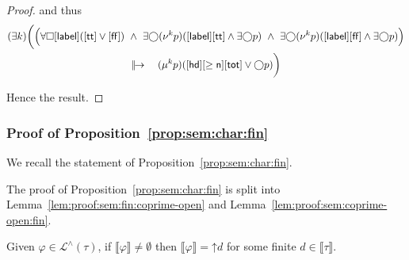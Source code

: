 \documentclass[%
  a4paper,
  UKenglish,
  cleveref,
  autoref,
  thm-restate,
  numberwithinsect,
]{lipics-v2021}
\newcommand\up{\mathord{\uparrow}}
\newcommand\I[1]{\llbracket #1 \rrbracket} %
\newcommand\Next{\mathord{\bigcirc}}
\renewcommand{\Box}{\square}
\newcommand\term[1]{\mathsf{#1}}
\newcommand\hd{\mathop{\term{hd}}}
\newcommand\lbl{\mathop{\term{label}}}
\newcommand\true{\term{tt}}
\newcommand\false{\term{ff}}
\newcommand\defrealto{\mathrel\parallel\joinrel\to}
\newcommand\realto{\mathrel{\defrealto}}
\newcommand\PT{\tau}		%
\newcommand\itvar{k}
\newcommand\tot{\term{tot}}
\newcommand\FP{p}
\newcommand\finmu{\mu}
\newcommand\finnu{\nu}
\newcommand\Lang{\mathcal{L}}
\newcommand\form[1]{\lbrack #1 \rbrack}
\begin{document}
\begin{proof}
\noindent
and thus
\begin{multline*}
  (\exists \itvar) 
  \bigg(
  \Big(
  \forall\Box\form\lbl(\form\true \lor \form\false)
  ~\land~
  \exists\Next(\finnu^{\itvar} \FP)(\form\lbl\form\true \land \exists\Next\FP)
  ~\land~
  \exists\Next(\finnu^{\itvar} \FP)(\form\lbl\form\false \land \exists\Next\FP)
  \Big)
\\
  \realto\quad
  (\finmu^\itvar \FP)(\form\hd \form{\geq \term n} \form\tot \lor \Next \FP)
  \bigg)
\end{multline*}

\noindent
Hence the result.
\end{proof}






\subsubsection{Proof of Proposition~\ref{prop:sem:char:fin}}

We recall the statement of Proposition~\ref{prop:sem:char:fin}.

\PropTopCharFin*

The proof of Proposition~\ref{prop:sem:char:fin}
is split into Lemma~\ref{lem:proof:sem:fin:coprime-open}
and Lemma~\ref{lem:proof:sem:coprime-open:fin}.

\begin{lemma}
\label{lem:proof:sem:fin:coprime-open}
Given $\varphi \in \Lang^\land(\PT)$, if $\I\varphi \neq \emptyset$ then
$\I\varphi = \up d$ for some finite $d \in \I\PT$.
\end{lemma}
\end{document}
